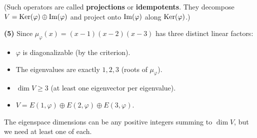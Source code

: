 \documentclass{report}
\begin{document}
\begin{solution}
(Such operators are called \textbf{projections} or \textbf{idempotents}. They decompose \(V = \operatorname{Ker}(\varphi) \oplus \operatorname{Im}(\varphi)\) and project onto \(\operatorname{Im}(\varphi)\) along \(\operatorname{Ker}(\varphi)\).)

\textbf{(5)} Since \(\mu_\varphi(x) = (x-1)(x-2)(x-3)\) has three distinct linear factors:
\begin{itemize}
    \item \(\varphi\) is diagonalizable (by the criterion).
    \item The eigenvalues are exactly \(1, 2, 3\) (roots of \(\mu_\varphi\)).
    \item \(\dim V \geq 3\) (at least one eigenvector per eigenvalue).
    \item \(V = E(1, \varphi) \oplus E(2, \varphi) \oplus E(3, \varphi)\).
\end{itemize}
The eigenspace dimensions can be any positive integers summing to \(\dim V\), but we need at least one of each.
\end{solution}
\end{document}
